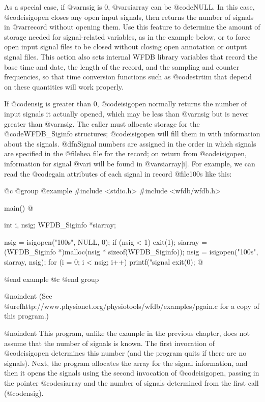 {{{{{{{{{As a special case, if @var{nsig} is 0, @var{siarray} can be @code{NULL}.
In this case, @code{isigopen} closes any open input signals, then
returns the number of signals in @var{record} without opening them.  Use
this feature to determine the amount of storage needed for
signal-related variables, as in the example below, or to force open
input signal files to be closed without closing open annotation or
output signal files.  This action also sets internal WFDB library
variables that record the base time and date, the length of the record,
and the sampling and counter frequencies, so that time conversion
functions such as @code{strtim} that depend on these quantities will
work properly.

If @code{nsig} is greater than 0, @code{isigopen} normally returns the
number of input signals it actually opened, which may be less than
@var{nsig} but is never greater than @var{nsig}.  The caller must
allocate storage for the @code{WFDB_Siginfo} structures; @code{isigopen}
will fill them in with information about the signals.  @dfn{Signal
numbers} are assigned in the order in which signals are specified in the
@file{hea} file for the record; on return from @code{isigopen},
information for signal @var{i} will be found in @var{siarray[i]}.  For
example, we can read the @code{gain} attributes of each signal in record
@file{100s} like this:

@c @group
@example
#include <stdio.h>
#include <wfdb/wfdb.h>

main()
@{
    int i, nsig;
    WFDB_Siginfo *siarray;

    nsig = isigopen("100s", NULL, 0);
    if (nsig < 1)
        exit(1);
    siarray = (WFDB_Siginfo *)malloc(nsig * sizeof(WFDB_Siginfo));
    nsig = isigopen("100s", siarray, nsig);
    for (i = 0; i < nsig; i++)
        printf("signal %
    exit(0);
@}
@end example
@c @end group

@noindent
(See @uref{http://www.physionet.org/physiotools/wfdb/examples/pgain.c}
for a copy of this program.)

@noindent
This program, unlike the example in the previous chapter, does not
assume that the number of signals is known.  The first invocation of
@code{isigopen} determines this number (and the program quits if there
are no signals).  Next, the program allocates the array for the signal
information, and then it opens the signals using the second
invocation of @code{isigopen}, passing in the pointer @code{siarray} and the
number of signals determined from the first call (@code{nsig}).

}}}}}}}}}
